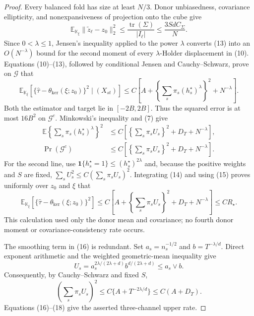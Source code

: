 \documentclass{article}
\begin{document}
\begin{proof}
Every balanced fold has size at least \(N/3\).  Donor unbiasedness,
covariance ellipticity, and nonexpansiveness of projection onto the cube give
\[
 \mathbb E_{\mathbb K_\xi}
 \|\widetilde z_\ell-z_0\|_2^2
 \le \frac{\operatorname{tr}(\Sigma)}{|I_\ell|}
 \le\frac{3SdC_\Sigma}{N}.                                    \tag{13}
\]
Since \(0<\lambda\le1\), Jensen's inequality applied to the power
\(\lambda\) converts (13) into an \(O(N^{-\lambda})\) bound for the
second moment of every \(\lambda\)-Holder displacement in (10).  Equations
(10)--(13), followed by conditional Jensen and Cauchy--Schwarz, prove on
\(\mathcal G\) that
\[
 \mathbb E_{\mathbb K_\xi}
 [\{\widehat\tau-\theta_{\mathrm{ker}}(\xi;z_0)\}^2
   \mid(X_{st})]
 \le C\left[A+\left\{\sum_s\pi_s(h_s^\star)^\lambda\right\}^2
                  +N^{-\lambda}\right].                       \tag{14}
\]
Both the estimator and target lie in \([-2B,2B]\).  Thus the squared error
is at most \(16B^2\) on \(\mathcal G^c\).  Minkowski's inequality and (7)
give
\[
 \begin{split}
 \mathbb E\left\{\sum_s\pi_s(h_s^\star)^\lambda\right\}^2
 &\le C\left[\left\{\sum_s\pi_sU_s\right\}^2+D_T+N^{-\lambda}\right],\\
 \Pr(\mathcal G^c)
 &\le C\left[\left\{\sum_s\pi_sU_s\right\}^2+D_T+N^{-\lambda}\right].
                                                                    \tag{15}
 \end{split}
\]
For the second line, use \(\mathbf1\{h_s^\star=1\}\le
(h_s^\star)^{2\lambda}\) and, because the positive weights and \(S\) are
fixed, \(\sum_sU_s^2\le C(\sum_s\pi_sU_s)^2\).  Integrating (14) and using
(15) proves uniformly over \(z_0\) and \(\xi\) that
\[
 \mathbb E_{\mathbb K_\xi}
 [\{\widehat\tau-\theta_{\mathrm{ker}}(\xi;z_0)\}^2]
 \le C\left[A+\left\{\sum_s\pi_sU_s\right\}^2
                 +D_T+N^{-\lambda}\right]
 \le CR_\star.                                                \tag{16}
\]
This calculation used only the donor mean and covariance; no fourth donor
moment or covariance-consistency rate occurs.

The smoothing term in (16) is redundant.  Set
\(a_s=n_s^{-1/2}\) and \(b=T^{-\lambda/d}\).  Direct exponent arithmetic
and the weighted geometric-mean inequality give
\[
 U_s=a_s^{2\lambda/(2\lambda+d)}b^{d/(2\lambda+d)}
 \le a_s\vee b.                                                \tag{17}
\]
Consequently, by Cauchy--Schwarz and fixed \(S\),
\[
 \left(\sum_s\pi_sU_s\right)^2
 \le C\{A+T^{-2\lambda/d}\}
 \le C(A+D_T).                                                 \tag{18}
\]
Equations (16)--(18) give the asserted three-channel upper rate.


\end{proof}
\end{document}
